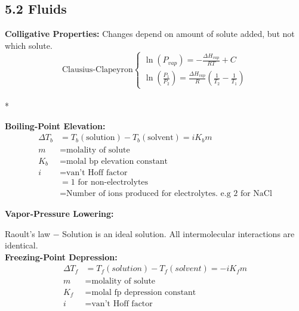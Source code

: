 \subsection{5.2 Fluids}
    \textbf{Colligative Properties: }Changes depend on amount of solute added, but not which solute.
    $$
    \text{Clausius-Clapeyron} \left\{
        \begin{array}{ll}
            \ln(P_{vap}) = - \frac{\Delta H_{vap}}{RT} + C\\
            \ln(\frac{P_1}{P_2}) = \frac{\Delta H_{vap}}{R} \left( \frac{1}{T_2} - \frac{1}{T_1} \right)
        \end{array}
        \right.
    $$\\*


    \textbf{Boiling-Point Elevation:}
    \begin{align*}
        \Delta T_b & = T_b (\textrm{solution}) - T_b (\textrm{solvent}) = iK_b m\\
        m & = \text{molality of solute}\\
        K_b & = \text{molal bp elevation constant}\\
        i & = \text{van't Hoff factor}\\
        & = 1 \text{ for non-electrolytes}\\
        & = \text{Number of ions produced for electrolytes.\ e.g 2 for NaCl}
    \end{align*}
    
    \textbf{Vapor-Pressure Lowering: }
    
        Raoult's law $-$ Solution is an ideal solution. All intermolecular interactions are identical.\\

    \textbf{Freezing-Point Depression: }
        \begin{align*}
            \Delta T_f & = T_f (solution) - T_f (solvent) = -iK_{f}m\\
            m & = \text{molality of solute}\\
            K_f & = \text{molal fp depression constant}\\
            i & = \text{van't Hoff factor}
        \end{align*}